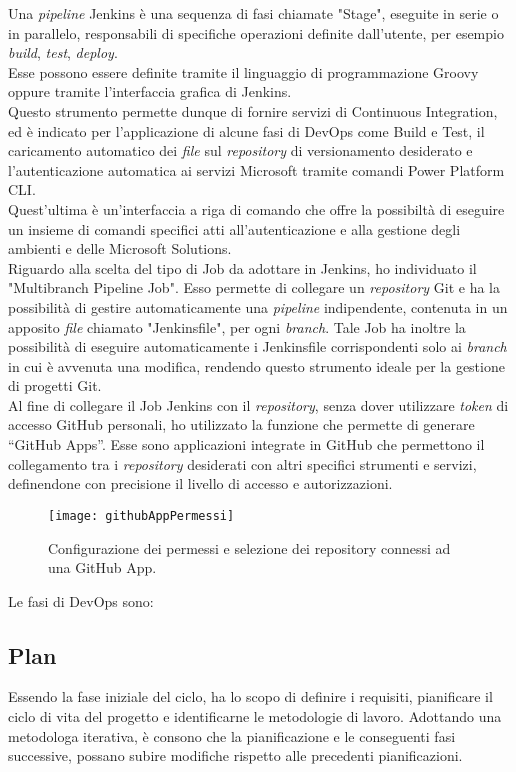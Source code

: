 Una \emph{pipeline} Jenkins è una sequenza di fasi chiamate "Stage", eseguite in serie o in parallelo, responsabili di specifiche operazioni definite dall'utente, per esempio \emph{build}, \emph{test}, \emph{deploy}.\\
Esse possono essere definite tramite il linguaggio di programmazione Groovy oppure tramite l'interfaccia grafica di Jenkins.\\
Questo strumento permette dunque di fornire servizi di \gls{Continuous Integration}, ed è indicato per l'applicazione di alcune fasi di \gls{DevOps} come Build e Test, il caricamento automatico dei \emph{file} sul \emph{repository} di versionamento desiderato e l'autenticazione automatica ai servizi Microsoft tramite comandi Power Platform CLI.\\
Quest'ultima è un'interfaccia a riga di comando che offre la possibiltà di eseguire un insieme di comandi specifici atti all'autenticazione e alla gestione degli ambienti e delle Microsoft Solutions.\\
Riguardo alla scelta del tipo di Job da adottare in Jenkins, ho individuato il "Multibranch Pipeline Job".
Esso permette di collegare un \emph{repository} Git e ha la possibilità di gestire automaticamente una \emph{pipeline} indipendente, contenuta in un apposito \emph{file} chiamato "Jenkinsfile", per ogni \emph{branch}.
Tale Job ha inoltre la possibilità di eseguire automaticamente i Jenkinsfile corrispondenti solo ai \emph{branch} in cui è avvenuta una modifica, rendendo questo strumento ideale per la gestione di progetti Git.\\

Al fine di collegare il Job Jenkins con il \emph{repository}, senza dover utilizzare \emph{token} di accesso GitHub personali, ho utilizzato la funzione che permette di generare “GitHub Apps”.
Esse sono applicazioni integrate in GitHub che permettono il collegamento tra i \emph{repository} desiderati con altri specifici strumenti e servizi, definendone con precisione il livello di accesso e autorizzazioni.  
\begin{figure}[htbp] 
    \centering 
    \texttt{[image: githubAppPermessi]} 
    \caption{Configurazione dei permessi e selezione dei repository connessi ad una GitHub App.}
    \label{fig:githubAppPermessi}
\end{figure}

\newline \noindent Le fasi di \gls{DevOps} sono:\\
\subsection{Plan}
Essendo la fase iniziale del ciclo, ha lo scopo di definire i requisiti, pianificare il ciclo di vita del progetto e identificarne le metodologie di lavoro.
Adottando una metodologa iterativa, è consono che la pianificazione e le conseguenti fasi successive, possano subire modifiche rispetto alle precedenti pianificazioni.\\

